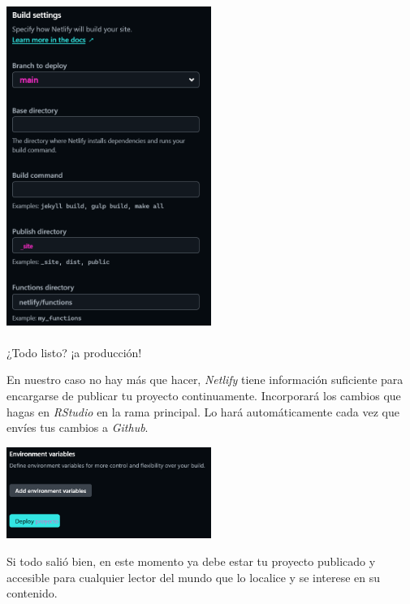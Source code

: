 \documentclass[
  letterpaper,
  DIV=11,
  numbers=noendperiod]{scrartcl}
\makeatletter
\let\oldparagraph\paragraph
\renewcommand{\paragraph}{
    \@ifstar
      \xxxParagraphStar
      \xxxParagraphNoStar
  }
\newcommand{\xxxParagraphStar}[1]{\oldparagraph*{#1}\mbox{}}
\newcommand{\xxxParagraphNoStar}[1]{\oldparagraph{#1}\mbox{}}
\makeatother
\begin{document}
\includegraphics[width=0.5\textwidth,height=\textheight]{images/Netlify-config-site-2.png}

\paragraph{¿Todo listo? ¡a
producción!}\label{todo-listo-a-producciuxf3n}

En nuestro caso no hay más que hacer, \emph{Netlify} tiene información
suficiente para encargarse de publicar tu proyecto continuamente.
Incorporará los cambios que hagas en \emph{RStudio} en la rama
principal. Lo hará automáticamente cada vez que envíes tus cambios a
\emph{Github}.

\includegraphics[width=0.5\textwidth,height=\textheight]{images/Netlify-config-site-3.png}

Si todo salió bien, en este momento ya debe estar tu proyecto publicado
y accesible para cualquier lector del mundo que lo localice y se
interese en su contenido.
\end{document}
